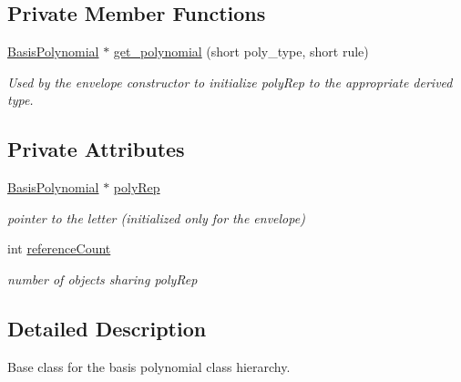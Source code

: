 \subsection*{Private Member Functions}
\begin{DoxyCompactItemize}
\item 
\hyperlink{classPecos_1_1BasisPolynomial}{Basis\+Polynomial} $\ast$ \hyperlink{classPecos_1_1BasisPolynomial_a76cffba3f7273eb68941a640363a6209}{get\+\_\+polynomial} (short poly\+\_\+type, short rule)
\begin{DoxyCompactList}\small\item\em Used by the envelope constructor to initialize poly\+Rep to the appropriate derived type. \end{DoxyCompactList}\end{DoxyCompactItemize}
\subsection*{Private Attributes}
\begin{DoxyCompactItemize}
\item 
\hyperlink{classPecos_1_1BasisPolynomial}{Basis\+Polynomial} $\ast$ \hyperlink{classPecos_1_1BasisPolynomial_a48a3787994e61838201fcfc71e2f1a54}{poly\+Rep}\label{classPecos_1_1BasisPolynomial_a48a3787994e61838201fcfc71e2f1a54}

\begin{DoxyCompactList}\small\item\em pointer to the letter (initialized only for the envelope) \end{DoxyCompactList}\item 
int \hyperlink{classPecos_1_1BasisPolynomial_afff0b6144883d3ca09a8d0d3f4776b0f}{reference\+Count}\label{classPecos_1_1BasisPolynomial_afff0b6144883d3ca09a8d0d3f4776b0f}

\begin{DoxyCompactList}\small\item\em number of objects sharing poly\+Rep \end{DoxyCompactList}\end{DoxyCompactItemize}


\subsection{Detailed Description}
Base class for the basis polynomial class hierarchy. 

